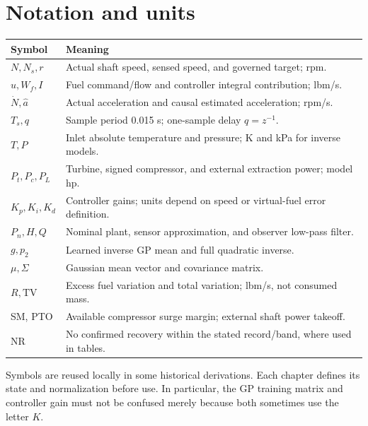 \documentclass[11pt,a4paper,oneside]{report}
\begin{document}

\chapter*{Notation and units}
\begin{longtable}{p{28mm}p{126mm}}\toprule Symbol & Meaning\\\midrule
$N,N_s,r$ & Actual shaft speed, sensed speed, and governed target; rpm.\\
$u,W_f,I$ & Fuel command/flow and controller integral contribution; lbm/s.\\
$\dot N,\hat a$ & Actual acceleration and causal estimated acceleration; rpm/s.\\
$T_s,q$ & Sample period 0.015 s; one-sample delay $q=z^{-1}$.\\
$T,P$ & Inlet absolute temperature and pressure; K and kPa for inverse models.\\
$P_t,P_c,P_L$ & Turbine, signed compressor, and external extraction power; model hp.\\
$K_p,K_i,K_d$ & Controller gains; units depend on speed or virtual-fuel error definition.\\
$P_n,H,Q$ & Nominal plant, sensor approximation, and observer low-pass filter.\\
$g,p_2$ & Learned inverse GP mean and full quadratic inverse.\\
$\mu,\Sigma$ & Gaussian mean vector and covariance matrix.\\
$R,\mathrm{TV}$ & Excess fuel variation and total variation; lbm/s, not consumed mass.\\
SM, PTO & Available compressor surge margin; external shaft power takeoff.\\
NR & No confirmed recovery within the stated record/band, where used in tables.\\\bottomrule
\end{longtable}
Symbols are reused locally in some historical derivations. Each chapter defines its state and normalization before use. In particular, the GP training matrix and controller gain must not be confused merely because both sometimes use the letter $K$.

\tableofcontents\clearpage\listoffigures\clearpage\listoftables
\clearpage{}















\appendix




\end{document}
